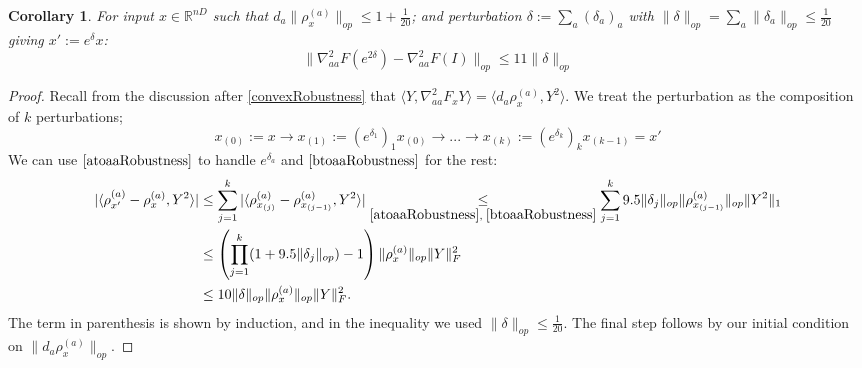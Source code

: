 \documentclass{article}
\newtheorem{corollary}[theorem]{Corollary}
\newcommand{\R}{{\mathbb{R}}}
\newcommand\samp{x}
\newcommand{\CF}[1]{{\color{purple}[CF: #1]}}
\begin{document}
\begin{corollary} \label{diagRobustness}
For input $\samp \in \R^{nD}$ such that $d_{a}\|\rho_{\samp}^{(a)}\|_{op} \leq 1+\frac{1}{20}$; and perturbation $\delta := \sum_{a} (\delta_{a})_{a}$ with $\|\delta\|_{op} = \sum_{a} \|\delta_{a}\|_{op} \leq \frac{1}{20}$ giving $\samp' := e^{\delta} \samp$:
\[ \|\nabla^{2}_{aa} F(e^{2\delta}) - \nabla^{2}_{aa} F(I)\|_{op} \leq 11 \|\delta\|_{op}     \]
\end{corollary}
\begin{proof}
Recall from the discussion after \ref{convexRobustness} that $\langle Y, \nabla^{2}_{aa} F_{\samp} Y \rangle = \langle d_{a} \rho_{\samp}^{(a)}, Y^{2} \rangle$. We treat the perturbation as the composition of $k$ perturbations; 
\[ \samp_{(0)}:=\samp \to \samp_{(1)}:= (e^{\delta_{1}})_1 \samp_{(0)} \to ... \to \samp_{(k)}:=(e^{\delta_{k}})_{k} \samp_{(k-1)} = \samp'  \]
We can use $\ref{atoaaRobustness}$ to handle $e^{\delta_{a}}$ and $\ref{btoaaRobustness}$ for the rest:
\begin{align*}
 |\langle \rho_{\samp'}^{(a)} - \rho_{\samp}^{(a)}, Y^{2} \rangle| 
 &\leq \sum_{j=1}^{k} |\langle \rho_{\samp_{(j)}}^{(a)} - \rho_{\samp_{(j-1)}}^{(a)}, Y^{2} \rangle| \underset{\ref{atoaaRobustness},\;\ref{btoaaRobustness}}{\leq} \sum_{j=1}^{k}  9.5 \|\delta_{j}\|_{op} \|\rho_{\samp_{(j-1)}}^{(a)}\|_{op} \|Y^{2}\|_{1} \\
& \leq \left( \prod_{j=1}^k (1+9.5 \|\delta_{j}\|_{op}) - 1 \right) \|\rho_{\samp}^{(a)}\|_{op} \|Y\|_{F}^{2} \\
&\leq 10 \|\delta\|_{op} \|\rho_{\samp}^{(a)}\|_{op} \|Y\|_{F}^{2}.   \end{align*}
The term in parenthesis is shown by induction, and in the inequality we used $\|\delta\|_{op} \leq \frac{1}{20}$. The final step follows by our initial condition on $\|d_{a} \rho_{\samp}^{(a)}\|_{op}$. 
\end{proof}
\end{document}
